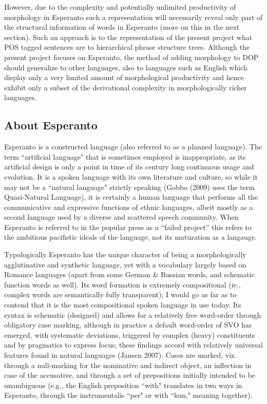 \documentclass[10pt,a4paper]{article}
\begin{document}
However, due to the complexity and potentially unlimited productivity of
morphology in Esperanto such a representation will necessarily reveal
only part of the structural information of words in Esperanto (more on this
in the next section). Such an approach is to the representation of the present
project what POS tagged sentences are to hierarchical phrase structure trees.
Although the present project focuses on Esperanto, the method of adding
morphology to DOP should generalize to other languages, also to languages
such as English which display only a very limited amount of morphological
productivity and hence exhibit only a subset of the derivational complexity in
morphologically richer languages.

\subsection{About Esperanto}

Esperanto is a constructed language (also referred to as a planned language).
The term ``artificial language" that is sometimes employed is inappropriate, as
its artificial design is only a point in time of its century long continuous
usage and evolution. It is a spoken language with its own literature and
culture, so while it may not  be a ``natural language" strictly speaking (Gobbo
(2009) uses the term Quasi-Natural Language), it is certainly a human language
that performs all the communicative and expressive functions of ethnic
languages, albeit mostly as a second language used by a diverse and scattered
speech community. When Esperanto is referred to in the popular press as a
``failed project'' this refers to the ambitious pacifistic ideals of the
language, not its maturation as a langauge.

Typologically Esperanto has the unique character of being a morphologically
agglutinative and synthetic language, yet with a vocabulary largely based on
Romance languages (apart from some German \& Russian words, and schematic
function words as well). Its word formation is extremely compositional (ie.,
complex words are semantically fully transparent); I would go as far as to
contend that it is the most compositional spoken language in use today. Its
syntax is schematic (designed) and allows for a relatively free word-order
through obligatory case marking, although in practice a default word-order of
SVO has emerged, with systematic deviations, triggered by complex (heavy)
constituents and by pragmatics to express focus; these findings accord with
relatively universal features found in natural languages (Jansen 2007). Cases
are marked, viz. through a null-marking for the nominative and indirect object,
an inflection in case of the accusative, and through a set of prepositions
initially intended to be unambiguous (e.g., the English preposition ``with"
translates in two ways in Esperanto, through the instrumentalis ``per" or with
``kun," meaning together). 
\end{document}
